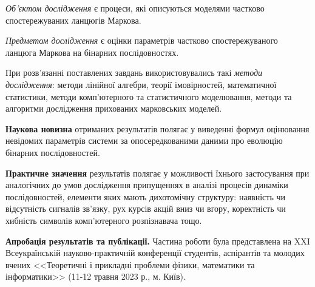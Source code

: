\emph{Об'єктом дослідження} є процеси, які описуються моделями частково спостережуваних ланцюгів Маркова.

\emph{Предметом дослідження} є оцінки параметрів частково спостережуваного ланцюга Маркова на бінарних послідовностях.

При розв’язанні поставлених завдань використовувались такі \emph{методи дослідження}: методи лінійної  алгебри, теорії імовірностей, математичної статистики, методи комп’ютерного та статистичного моделювання, методи та алгоритми дослідження прихованих марковських моделей.

\textbf{Наукова новизна} отриманих результатів полягає у виведенні формул оцінювання невідомих параметрів системи за опосередкованими даними про еволюцію бінарних послідовностей.  

\textbf{Практичне значення} результатів полягає у можливості їхнього застосування при аналогічних до умов дослідження припущеннях в аналізі процесів динаміки послідовностей, елементи яких мають дихотомічну структуру: наявність чи відсутність сигналів зв'язку, рух курсів акцій вниз чи вгору, коректність чи хибність символів комп'ютерного розпізнавача тощо.

\textbf{Апробація результатів та публікації.} Частина роботи була представлена на XXI Всеукраїнській науково-практичній конференції студентів, аспірантів та молодих вчених <<Теоретичні і прикладні проблеми фізики, математики та інформатики>> (11-12 травня 2023 р., м. Київ).